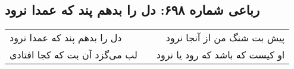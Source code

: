 \begin{center}
\section*{رباعی شماره ۶۹۸: دل را بدهم پند که عمدا نرود}
\label{sec:0698}
\begin{longtable}{l p{0.5cm} r}
دل را بدهم پند که عمدا نرود
&&
پیش بت شنگ من از آنجا نرود
\\
لب می‌گزد آن بت که کجا افتادی
&&
او کیست که باشد که رود یا نرود
\\
\end{longtable}
\end{center}
